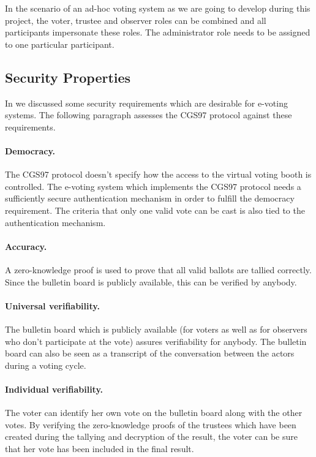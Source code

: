 \documentclass[numbers=noenddot, abstract=on, a4paper, headsepline,
footsepline, oneside, draft=off]{scrreprt}
\begin{document}
In the scenario of an ad-hoc voting system as we are going to develop during
this project, the voter, trustee and observer roles can be combined and all
participants impersonate these roles. The administrator role needs to be
assigned to one particular participant.

\subsection{Security Properties}
\label{sec:secproperties}
In  we discussed some security requirements which
are desirable for e-voting systems. The following paragraph assesses the CGS97
protocol against these requirements.

\paragraph{Democracy.} The CGS97 protocol doesn't specify how the access to
the virtual voting booth is controlled. The e-voting system which implements
the CGS97 protocol needs a sufficiently secure authentication mechanism in order to
fulfill the democracy requirement. The criteria that only one valid vote can be
cast is also tied to the authentication mechanism.

\paragraph{Accuracy.} A zero-knowledge proof is used to prove that all valid
ballots are tallied correctly. Since the bulletin board is publicly available,
this can be verified by anybody.

\paragraph{Universal verifiability.} The bulletin board which is publicly
available (for voters as well as for observers who don't participate at the
vote) assures verifiability for anybody. The bulletin board can also
be seen as a transcript of the conversation between the actors during a voting
cycle. 

\paragraph{Individual verifiability.} The voter can identify her own vote on
the bulletin board along with the other votes. By verifying the zero-knowledge
proofs of the trustees which have been created during the tallying and
decryption of the result, the voter can be sure that her vote has been included
in the final result.
\end{document}
